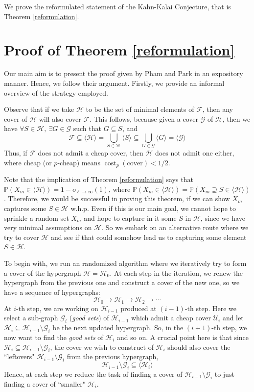 \documentclass[12pt,oneside,reqno]{amsart}
\theoremstyle{definition}
\numberwithin{equation}{theorem}
\newcommand{\PP}{{\mathbb P}}%
\newcommand{\cF}{{\mathcal F}}
\newcommand{\cG}{{\mathcal G}}
\newcommand{\cH}{{\mathcal H}}
\newcommand{\cU}{{\mathcal U}}
\begin{document}
We prove the reformulated statement of the Kahn-Kalai Conjecture, that is Theorem \ref{reformulation}.

\section{Proof of Theorem \ref{reformulation}}

Our main aim is to present the proof given by Pham and Park \cite{ppkkc} in an expository manner. Hence, we follow their argument. Firstly, we provide an informal overview of the strategy employed. 

Observe that if we take $\cH$ to be the set of minimal elements of $\cF$, then any cover of $\cH$ will also cover $\cF$. This follows, because given a cover $\cG$ of $\cH$, then we have $\forall S \in \cH, \ \exists G \in \cG$ such that $G\subseteq S$, and 
\begin{equation}\label{cc}
\cF \subseteq \langle \cH \rangle=\bigcup_{S \in \cH}\langle S\rangle \subseteq \bigcup_{G \in \cG}\langle G\rangle=\langle \cG \rangle
\end{equation}
Thus, if $\cF$ does not admit a cheap cover, then $\cH$ does not admit one either, where cheap (or $p$-cheap) means $\operatorname{cost}_p(\text{cover}) < 1/2$.

Note that the implication of Theorem \ref{reformulation} says that $\PP\left(X_{ m} \in \langle \cH \rangle \right) = 1-o_{\ell \rightarrow \infty}(1)$, where $\PP\left(X_{ m} \in \langle \cH \rangle \right) = \PP\left(X_{ m} \supseteq S \in \langle \cH \rangle \right)$. Therefore, we would be successful in proving this theorem, if we can show $X_m$ captures some $S \in \cH$ w.h.p.  Even if this is our main goal, we cannot hope to sprinkle a random set $X_{ m}$ and hope to capture in it some $S$ in $\cH$, since we have very minimal assumptions on $\cH$. So we embark on an alternative route where we try to cover $\cH$ and see if that could somehow lead us to capturing some element $S \in \cH$.

To begin with, we run an randomized algorithm where we iteratively try to form a cover of the hypergraph $\cH = \cH_0$. At each step in the iteration, we renew the hypergraph from the previous one and construct a cover of the new one, so we have a sequence of hypergraphs: 
$$
\cH_{0} \longrightarrow \cH_{1} \longrightarrow \cH_{2} \longrightarrow \cdots
$$
At $i$-th step, we are working on $\cH_{i-1}$ produced at $(i-1)$-th step. Here we select a sub-graph $\cG_{i}$ (\emph{good sets}) of $\cH_{i-1}$ which admit a cheap cover $\cU_{i}$ and let $\cH_{i} \subseteq \cH_{i-1} \setminus \cG_{i}$ be the next updated hypergraph. So, in the $(i+1)$-th step, we now want to find the \emph{good sets} of $\cH_{i}$ and so on. A crucial point here is that since $\cH_{i} \subseteq \cH_{i-1} \setminus \cG_{i}$, the cover we wish to construct of $\cH_{i}$ should also cover the ``leftovers" $\cH_{i-1} \setminus \cG_{i} $ from the previous hypergraph, 
\[
\cH_{i-1}\setminus \cG_{i} \subseteq \langle \cH_{i} \rangle
\]
Hence, at each step we reduce the task of finding a cover of $\cH_{i-1} \setminus \cG_{i}$ to just finding a cover of ``smaller" $\cH_i$.
\end{document}
